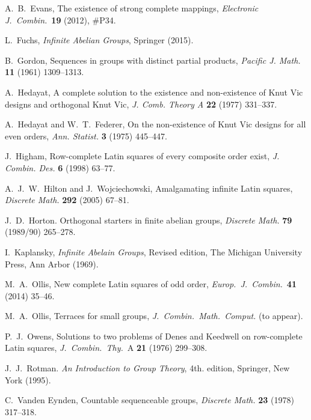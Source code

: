 \documentclass[12pt,a4paper]{article}
\begin{document}
\begin{thebibliography}{99}
A.~B.~Evans, The existence of strong complete mappings, {\em Electronic J.~Combin.}~{\bf 19} (2012), \#P34.


L.~Fuchs, {\em Infinite Abelian Groups}, Springer (2015).

 B.~Gordon, Sequences in groups with distinct partial products, {\em Pacific J. Math.} {\bf 11} (1961) 1309--1313.


 A.~Hedayat, A complete solution to the existence and non-existence of Knut Vic designs and orthogonal Knut Vic, {\em J. Comb. Theory A} {\bf 22}  (1977) 331--337.

 A.~Hedayat and W.~T.~Federer, On the non-existence of Knut Vic designs for all even orders, {\em Ann. Statist.} {\bf 3} (1975) 445--447.


J.~Higham, Row-complete Latin squares of every composite order exist, {\em J. Combin. Des.} {\bf 6} (1998) 63--77. 

A.~J.~W.~Hilton and J.~Wojciechowski, Amalgamating infinite Latin squares, {\em Discrete Math.} {\bf 292} (2005) 67--81.


J.~D.~Horton. Orthogonal starters in finite abelian groups, {\em Discrete Math.} {\bf 79} (1989/90) 265--278. 


I.~Kaplansky, {\em Infinite Abelain Groups}, Revised edition, The Michigan University Press, Ann Arbor (1969).



M.~A.~Ollis, New complete Latin squares of odd order, {\em Europ.~J.~Combin.}~{\bf 41} (2014) 35--46.

M.~A.~Ollis, Terraces for small groups, {\em J.~Combin.~Math.~Comput.} (to appear).

P.~J.~Owens,  Solutions to two problems of Denes and Keedwell on row-complete
Latin squares, {\em J.~Combin.~Thy.}~A {\bf 21} (1976) 299--308.

J.~J.~Rotman. {\em An Introduction to Group Theory}, 4th. edition, Springer, New York (1995).




C.~Vanden Eynden, Countable sequenceable groups, {\em Discrete Math.} {\bf 23} (1978) 317--318.




\end{thebibliography}
\end{document}
